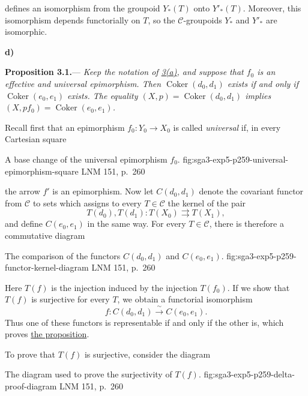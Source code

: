 \noindent defines an isomorphism from the groupoid \(Y_\ast(T)\) onto
\(Y'_\ast(T)\). Moreover, this isomorphism depends functorially on \(T\),
so the \(\mathscr C\)-groupoids \(Y_\ast\) and \(Y'_\ast\) are
isomorphic.%

\medskip
{}\label{par:sga3-V-3-d}%
\noindent\textbf{d)}

\medskip
{}\label{prop:sga3-V-3.1}%
\noindent\textbf{Proposition 3.1.}---
\textit{Keep the notation of \hyperref[par:sga3-V-3-a]{3(a)}, and suppose that \(f_0\) is an
effective and universal epimorphism. Then
\(\operatorname{Coker}(d_0,d_1)\) exists if and only if
\(\operatorname{Coker}(e_0,e_1)\) exists. The equality
\((X,p)=\operatorname{Coker}(d_0,d_1)\) implies
\((X,pf_0)=\operatorname{Coker}(e_0,e_1)\).}

Recall first that an epimorphism \(f_0:Y_0\to X_0\) is called
\emph{universal} if, in every Cartesian square

  {A base change of the universal epimorphism \(f_0\).}
  {fig:sga3-exp5-p259-universal-epimorphism-square}
  {LNM 151, p.~260}

\noindent the arrow \(f'\) is an epimorphism. Now let \(C(d_0,d_1)\)
denote the covariant functor from \(\mathscr C\) to sets which assigns to
every \(T\in\mathscr C\) the kernel of the pair
\[
  T(d_0),T(d_1):T(X_0)\rightrightarrows T(X_1),
\]
and define \(C(e_0,e_1)\) in the same way. For every
\(T\in\mathscr C\), there is therefore a commutative diagram

  {The comparison of the functors \(C(d_0,d_1)\) and \(C(e_0,e_1)\).}
  {fig:sga3-exp5-p259-functor-kernel-diagram}
  {LNM 151, p.~260}

Here \(T(f)\) is the injection induced by the injection \(T(f_0)\). If
we show that \(T(f)\) is surjective for every \(T\), we obtain a
functorial isomorphism
\[
  f:C(d_0,d_1)\xrightarrow{\ \sim\ }C(e_0,e_1).
\]
Thus one of these functors is representable if and only if the other is,
which proves \hyperref[prop:sga3-V-3.1]{the proposition}.

To prove that \(T(f)\) is surjective, consider the diagram

  {The diagram used to prove the surjectivity of \(T(f)\).}
  {fig:sga3-exp5-p259-delta-proof-diagram}
  {LNM 151, p.~260}

